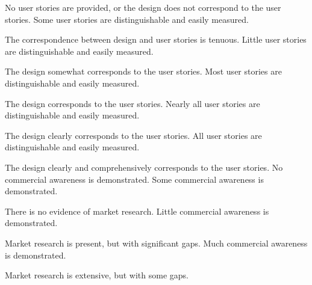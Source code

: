 \documentclass{../fal_assignment}
\begin{document}
\begin{markingrubric}
%
        \grade\fail No user stories are provided, or the design does not correspond to the user stories.
        \grade Some user stories are distinguishable and easily measured.
            \par The correspondence between design and user stories is tenuous.
        \grade Little user stories are distinguishable and easily measured.
            \par The design somewhat corresponds to the user stories.
        \grade Most user stories are distinguishable and easily measured.
            \par The design corresponds to the user stories.
        \grade Nearly all user stories are distinguishable and easily measured.
            \par The design clearly corresponds to the user stories.
        \grade All user stories are distinguishable and easily measured.
            \par The design clearly and comprehensively corresponds to the user stories.
%
        \grade\fail No commercial awareness is demonstrated.
        \grade Some commercial awareness is demonstrated.
            \par There is no evidence of market research.
        \grade Little commercial awareness is demonstrated.
            \par Market research is present, but with significant gaps.
        \grade Much commercial awareness is demonstrated.
            \par Market research is extensive, but with some gaps.

\end{markingrubric}
\end{document}
